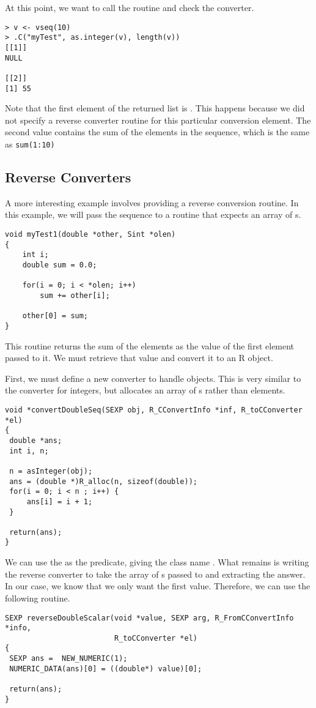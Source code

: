 \documentclass{article}
\begin{document}
At this point, we want to call the 
routine and check the converter.
\begin{verbatim}
> v <- vseq(10)
> .C("myTest", as.integer(v), length(v))
[[1]]
NULL

[[2]]
[1] 55
\end{verbatim}

Note that the first element of the returned list is \SNull. This
happens because we did not specify a reverse converter routine for
this particular conversion element.
The second value contains the sum of the elements in the 
sequence, which is the same as \verb+sum(1:10)+


\subsection{Reverse Converters}
A more interesting example involves providing a reverse conversion
routine.
In this example, we will pass the sequence to a routine 
that expects an array of s.
\begin{verbatim}
void myTest1(double *other, Sint *olen)
{
    int i;
    double sum = 0.0;
  
    for(i = 0; i < *olen; i++)
        sum += other[i];

    other[0] = sum;
}
\end{verbatim}
This routine returns the sum of the elements as the 
value of the first element passed to it.
We must retrieve that value and convert it
to an R object.

First, we must define a new converter to handle
 objects.  This is very similar to the
converter for integers, but allocates an array of s
rather than  elements.
\begin{verbatim}
void *convertDoubleSeq(SEXP obj, R_CConvertInfo *inf, R_toCConverter *el)
{
 double *ans;
 int i, n;

 n = asInteger(obj);
 ans = (double *)R_alloc(n, sizeof(double));
 for(i = 0; i < n ; i++) {
     ans[i] = i + 1;
 }

 return(ans);
}
\end{verbatim}

We can use the  as the predicate, giving the
class name .  What remains is writing
the reverse converter to take the array of s passed to
 and extracting the answer.  In our case, we know
that we only want the first value. Therefore, we can use the following
routine.
\begin{verbatim}
SEXP reverseDoubleScalar(void *value, SEXP arg, R_FromCConvertInfo *info,
                         R_toCConverter *el)
{
 SEXP ans =  NEW_NUMERIC(1);
 NUMERIC_DATA(ans)[0] = ((double*) value)[0];

 return(ans);
}
\end{verbatim}
\end{document}
